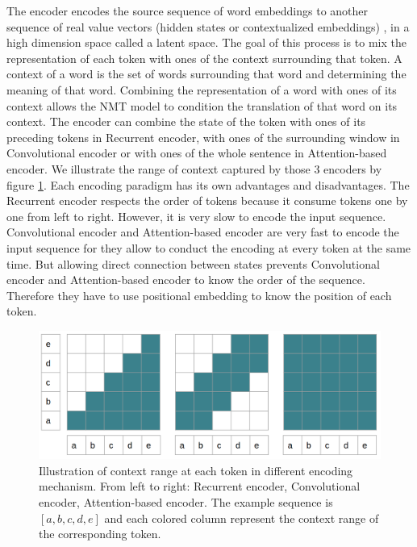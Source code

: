 The encoder encodes the source sequence of word embeddings to another sequence of real value vectors (hidden states or contextualized embeddings) \citep{Vaswani17attention,Bahdanau15learning, Cho14properties}, in a high dimension space called a latent space. The goal of this process is to mix the representation of each token with ones of the context surrounding that token. A context of a word is the set of words surrounding that word and determining the meaning of that word. Combining the representation of a word with ones of its context allows the NMT model to condition the translation of that word on its context. The encoder can combine the state of the token with ones of its preceding tokens in Recurrent encoder, with ones of the surrounding window in Convolutional encoder or with ones of the whole sentence in Attention-based encoder. We illustrate the range of context captured by those 3 encoders by figure \ref{fig:encoding}. Each encoding paradigm has its own advantages and disadvantages. The Recurrent encoder respects the order of tokens because it consume tokens one by one from left to right. However, it is very slow to encode the input sequence. Convolutional encoder and Attention-based encoder are very fast to encode the input sequence for they allow to conduct the encoding at every token at the same time. But allowing direct connection between states prevents Convolutional encoder and Attention-based encoder to know the order of the sequence. Therefore they have to use positional embedding to know the position of each token. 

\begin{figure}[htbp]
\includegraphics[width=\textwidth]{graphics/encoding.png}
\caption[Illustration of context range at each token in different encoding mechanism]{Illustration of context range at each token in different encoding mechanism. From left to right: Recurrent encoder, Convolutional encoder, Attention-based encoder. The example sequence is $[a,b,c,d,e]$ and each colored column represent the context range of the corresponding token.}
\label{fig:encoding}
\end{figure}

